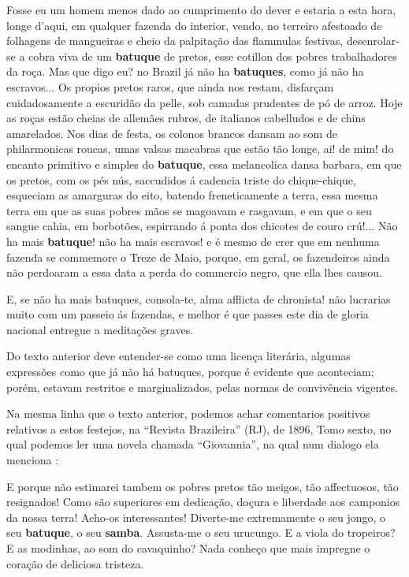 \begin{citando}%
Fosse eu um homem menos dado 
ao cumprimento do dever e estaria a 
esta hora, longe d'aqui, em qualquer 
fazenda do interior, vendo, no terreiro 
afestoado de folhagens de mangueiras e
cheio da palpitação das flammulas 
festivas, desenrolar-se a cobra viva de um 
\textbf{batuque} de pretos, esse cotillon dos 
pobres trabalhadores da roça. Mas que digo
eu? no Brazil já não ha \textbf{batuques}, como 
já não ha escravos... Os propios pretos
raros, que ainda nos restam, disfarçam 
cuidadosamente a escuridão da pelle, sob
camadas prudentes de pó de arroz. Hoje 
as roças estão cheias de allemães rubros,
de italianos cabelludos e de chins amarelados.
Nos dias de festa, os colonos brancos
dansam ao som de philarmonicas 
roucas, umas valsas macabras que estão
tão longe, ai! de mim! do encanto primitivo
e simples do \textbf{batuque}, essa melancolica 
dansa barbara, em que os pretos,
com os pés nús, saccudidos á cadencia
triste do chique-chique, esqueciam as 
amarguras do eito, batendo freneticamente a terra,
essa mesma terra em que as suas pobres mãos 
se magoavam e rasgavam, e em que o seu sangue cahia,
em borbotões, espirrando á ponta dos chicotes de couro crú!...
Não ha mais \textbf{batuque}! não ha mais escravos! e é mesmo de
crer que em nenhuma fazenda se commemore o Treze de Maio, 
porque, em geral, os fazendeiros ainda não perdoaram
a essa data a perda do commercio negro, que ella lhes causou.

E, se não ha mais batuques, consola-te, alma afflicta de 
chronista! não lucrarias muito com um passeio ás fazendas,
e melhor é que passes este dia de gloria nacional entregue 
a meditações graves.
\end{citando}
Do texto anterior deve entender-se como uma licença literária, algumas expressões
como que já não há batuques, porque é evidente que aconteciam; porém, 
estavam restritos e marginalizados, pelas normas de convivência vigentes.

Na mesma linha que o texto anterior, 
podemos achar comentarios positivos relativos a estos festejos, na ``Revista Brazileira'' (RJ), 
de 1896, Tomo sexto, no qual podemos ler uma novela chamada ``Giovannia'',
na qual num dialogo ela menciona \cite[pp. 155]{batuqueperiodicorevistabrasileira}:
\begin{citando}%
E porque não estimarei tambem os pobres pretos tão meigos, tão 
affectuosos, tão resignados! Como são superiores em dedicação, doçura
e liberdade aos camponios da nossa terra! Acho-os interessantes! 
Diverte-me extremamente o seu jongo, o seu \textbf{batuque}, o seu \textbf{samba}.
Assusta-me o seu urucungo. E a viola do tropeiros? E as modinhas, ao 
som do cavaquinho? Nada conheço que mais impregne o coração de
deliciosa tristeza.
\end{citando}

